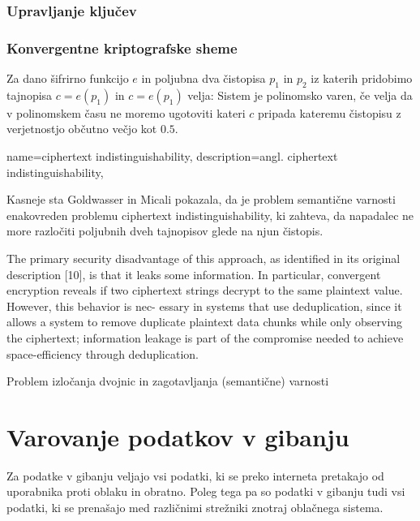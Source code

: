 \documentclass[12pt,a4paper,openany]{book}
\begin{document}
\subsubsection{Upravljanje ključev}
\label{subs:Upravljanje ključev}

\subsubsection{Konvergentne kriptografske sheme}
\label{subs:Konvergentne kriptografske sheme}


\begin{mdframed}[frametitle={Polinomska varnost}]
\label{def:polysec}
Za dano šifrirno funkcijo $e$ in poljubna dva čistopisa $p_1$ in $p_2$ iz katerih pridobimo tajnopisa $c=e(p_1)$ in $c=e(p_1)$ velja: Sistem je polinomsko varen, če velja da v polinomskem času ne moremo ugotoviti kateri $c$ pripada kateremu čistopisu z verjetnostjo občutno večjo kot $0.5$.
\end{mdframed}


{
  name=ciphertext indistinguishability,
  description={angl. ciphertext indistinguishability},
}

Kasneje sta \cite{Goldwasser1984} Goldwasser in Micali pokazala, da je problem semantične varnosti enakovreden problemu \gls{ciphertext indistinguishability}, ki zahteva, da napadalec ne more razločiti poljubnih dveh tajnopisov glede na njun čistopis.

The primary security disadvantage of this approach, as identified
in its original description [10], is that it leaks some information. In
particular, convergent encryption reveals if two ciphertext strings
decrypt to the same plaintext value. However, this behavior is nec-
essary in systems that use deduplication, since it allows a system
to remove duplicate plaintext data chunks while only observing the
ciphertext; information leakage is part of the compromise needed
to achieve space-efficiency through deduplication.

Problem izločanja dvojnic in zagotavljanja (semantične) varnosti


\section{Varovanje podatkov v gibanju}
\label{sec:Varovanje podatkov v gibanju}

Za podatke v gibanju veljajo vsi podatki, ki se preko interneta pretakajo od uporabnika proti oblaku in obratno. Poleg tega pa so podatki v gibanju tudi vsi podatki, ki se prenašajo med različnimi strežniki znotraj oblačnega sistema.
\end{document}

